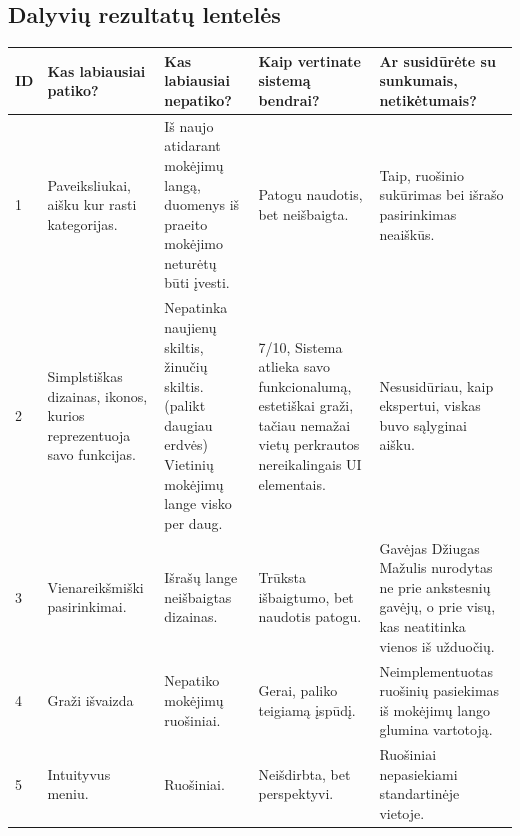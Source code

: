 \documentclass[oneside]{VUMIFPSkursinis}
\begin{document}
\subsection{Dalyvių rezultatų lentelės}
\begin{center}
	\begin{tabular}{ |p{1cm} | p{3cm} | p{4cm} | p{4cm} | p{3cm} |}
	\hline
ID&Kas labiausiai patiko?&Kas labiausiai nepatiko?&Kaip vertinate sistemą bendrai?&Ar susidūrėte su sunkumais, netikėtumais?\\ \hline
1&Paveiksliukai, aišku kur rasti kategorijas.&Iš naujo atidarant mokėjimų langą, duomenys iš praeito mokėjimo neturėtų būti įvesti.&Patogu naudotis, bet neišbaigta.&Taip, ruošinio sukūrimas bei išrašo pasirinkimas neaiškūs. \\ \hline
2&Simplstiškas dizainas, ikonos, kurios reprezentuoja savo funkcijas.&Nepatinka naujienų skiltis, žinučių skiltis.(palikt daugiau erdvės) Vietinių mokėjimų lange visko per daug.&7/10, Sistema atlieka savo funkcionalumą, estetiškai graži, tačiau nemažai vietų perkrautos nereikalingais UI elementais. & Nesusidūriau, kaip ekspertui, viskas buvo sąlyginai aišku. \\ \hline
3&Vienareikšmiški pasirinkimai.&Išrašų lange neišbaigtas dizainas.& Trūksta išbaigtumo, bet naudotis patogu.&Gavėjas Džiugas Mažulis nurodytas ne prie ankstesnių gavėjų, o prie visų, kas neatitinka vienos iš užduočių. \\ \hline
4&Graži išvaizda&Nepatiko mokėjimų ruošiniai.&Gerai, paliko teigiamą įspūdį.& Neimplementuotas ruošinių pasiekimas iš mokėjimų lango glumina vartotoją.\\ \hline
5&Intuityvus meniu.&Ruošiniai.&Neišdirbta, bet perspektyvi.&Ruošiniai nepasiekiami standartinėje vietoje.\\ \hline
\end{tabular}
\end{center}
\end{document}
